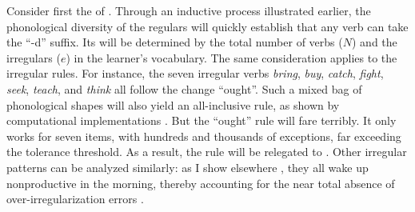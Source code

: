\documentclass[output=paper,
modfonts
]{LSP/langsci}
\begin{document}
Consider first the  of  .  Through an
inductive process illustrated earlier, 
the phonological diversity of the regulars will quickly
establish that any verb can take the ``{-d}'' suffix. Its 
will be determined by the total number of verbs ($N$) and the
irregulars ($e$) in the learner's vocabulary.  The same consideration
applies to the irregular rules. For instance, the seven irregular verbs
\textit{bring}, \textit{buy}, \textit{catch}, \textit{fight}, \textit{seek}, \textit{teach}, and \textit{think}  all follow the  change ``ought''. Such a mixed bag of
phonological shapes will also yield an all-inclusive rule, as
shown by computational implementations \citep{Yip1998a}. But the ``ought''
 rule will fare terribly. It only works for 
seven items, with hundreds and thousands of exceptions,  far
exceeding the tolerance threshold. As a result, the rule 
will be relegated to
.  Other irregular patterns can be analyzed similarly:
as I show elsewhere \citep[][Chapter 4]{POP}, they all
wake up nonproductive in the morning, thereby accounting for the near
total absence of over-irregularization errors \citep{Xu1995}.
\end{document}
